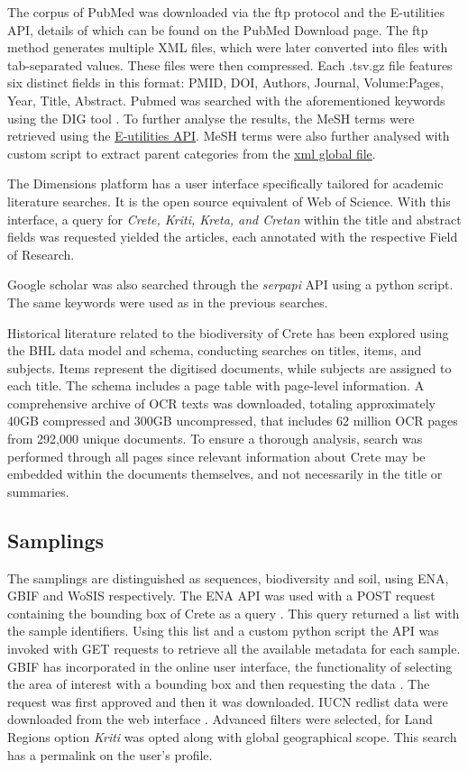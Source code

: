 The corpus of PubMed was downloaded via the ftp protocol and the E-utilities API, details of which can be found on the PubMed Download page.
The ftp method generates multiple XML files, which were later converted into
files with tab-separated values. These files were then compressed. Each .tsv.gz file
features six distinct fields in this format: PMID, DOI, Authors, Journal, Volume:Pages, Year, Title, Abstract.
Pubmed was searched with the aforementioned keywords using the DIG tool \parencite{fanini2021coupling}. To further 
analyse the results, the MeSH terms were retrieved using the \href{https://www.ncbi.nlm.nih.gov/books/NBK25497/}{E-utilities API}.
MeSH terms were also further analysed with custom script to extract 
parent categories from the \href{https://www.nlm.nih.gov/databases/download/mesh.html}{xml global file}.

The Dimensions platform has a user interface specifically tailored for academic literature searches.
It is the open source equivalent of Web of Science.
With this interface, a query for \textit{Crete, Kriti, Kreta, and Cretan} within
the title and abstract fields was requested yielded the articles, each annotated with the respective Field of Research.

Google scholar was also searched through the \textit{serpapi} API using
a python script. The same keywords were used as in the previous searches.

Historical literature related to the biodiversity of Crete has been explored
using the BHL data model and schema, conducting searches on titles, items, and subjects.
Items represent the digitised documents, while subjects are assigned to each title.
The schema includes a page table with page-level information.
A comprehensive archive of OCR texts was downloaded, totaling approximately
40GB compressed and 300GB uncompressed, that includes 62 million OCR pages from 292,000 unique documents.
To ensure a thorough analysis, search was performed through all pages since
relevant information about Crete may be embedded within the documents
themselves, and not necessarily in the title or summaries.

\subsection{Samplings}\label{crete_samplings}

The samplings are distinguished as sequences, biodiversity and soil, using ENA, GBIF and WoSIS respectively.
The ENA API was used with a POST request containing the bounding box of Crete as a query \parencite{Yuan2023}. This 
query returned a list with the sample identifiers. Using this list and a custom python script the API
was invoked with GET requests to retrieve all the available metadata for each sample.
GBIF has incorporated in the online user interface, the functionality of selecting the area of interest with a bounding box and then requesting
the data \parencite{noauthor_gbif_nodate}. The request was first approved and then it was downloaded. 
IUCN redlist data were downloaded from the web interface \parencite{iucn2024}.
Advanced filters were selected, for Land Regions option \textit{Kriti} was opted 
along with global geographical scope. This search has a permalink on the user's profile.

